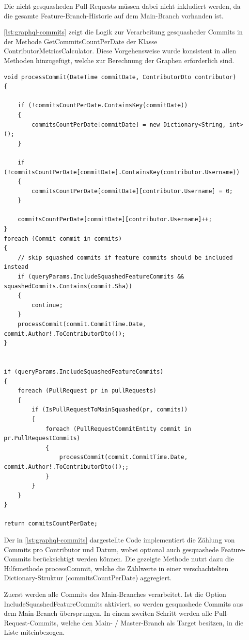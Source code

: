 Die nicht gesquasheden Pull-Requests müssen dabei nicht inkludiert werden, da die gesamte Feature-Branch-Historie auf dem Main-Branch vorhanden ist. 

\autoref{lst:graphql-commits} zeigt die Logik zur Verarbeitung gesquasheder Commits in der Methode GetCommitsCountPerDate der Klasse ContributorMetricsCalculator. Diese Vorgehensweise wurde konsistent in allen Methoden hinzugefügt, welche zur Berechnung der Graphen erforderlich sind.

\begin{lstlisting}[language=CSharp, caption={Verarbeitung gesquashter Commits in der Methode GetCommitsCountPerDate}, label={lst:graphql-commits}]
void processCommit(DateTime commitDate, ContributorDto contributor)
{

	if (!commitsCountPerDate.ContainsKey(commitDate))
	{
		commitsCountPerDate[commitDate] = new Dictionary<String, int>();
	}

	if (!commitsCountPerDate[commitDate].ContainsKey(contributor.Username))
	{
		commitsCountPerDate[commitDate][contributor.Username] = 0;
	}

	commitsCountPerDate[commitDate][contributor.Username]++;
}
foreach (Commit commit in commits)
{
	// skip squashed commits if feature commits should be included instead
	if (queryParams.IncludeSquashedFeatureCommits && squashedCommits.Contains(commit.Sha))
	{
		continue;
	}
	processCommit(commit.CommitTime.Date, commit.Author!.ToContributorDto());
}


if (queryParams.IncludeSquashedFeatureCommits)
{
	foreach (PullRequest pr in pullRequests)
	{
		if (IsPullRequestToMainSquashed(pr, commits))
		{
			foreach (PullRequestCommitEntity commit in pr.PullRequestCommits)
			{
				processCommit(commit.CommitTime.Date, commit.Author!.ToContributorDto());;		
			}	
		}
	}
}

return commitsCountPerDate;
\end{lstlisting}

Der in \autoref{lst:graphql-commits} dargestellte Code implementiert die Zählung von Commits pro Contributor und Datum, wobei optional auch gesquashede Feature-Commits berücksichtigt werden können. Die gezeigte Methode nutzt dazu die Hilfsmethode processCommit, welche die Zählwerte in einer verschachtelten Dictionary-Struktur (commitsCountPerDate) aggregiert.

Zuerst werden alle Commits des Main-Branches verarbeitet. Ist die Option IncludeSquashedFeatureCommits aktiviert, so werden gesquashede Commits aus dem Main-Branch übersprungen. In einem zweiten Schritt werden alle Pull-Request-Commits, welche den Main- / Master-Branch als Target besitzen, in die Liste miteinbezogen. 

